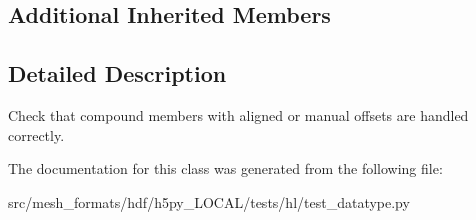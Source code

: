 \subsection*{Additional Inherited Members}


\subsection{Detailed Description}
\begin{DoxyVerb}    Check that compound members with aligned or manual offsets are handled
    correctly.
\end{DoxyVerb}
 

The documentation for this class was generated from the following file\+:\begin{DoxyCompactItemize}
\item 
src/mesh\+\_\+formats/hdf/h5py\+\_\+\+L\+O\+C\+A\+L/tests/hl/test\+\_\+datatype.\+py\end{DoxyCompactItemize}
